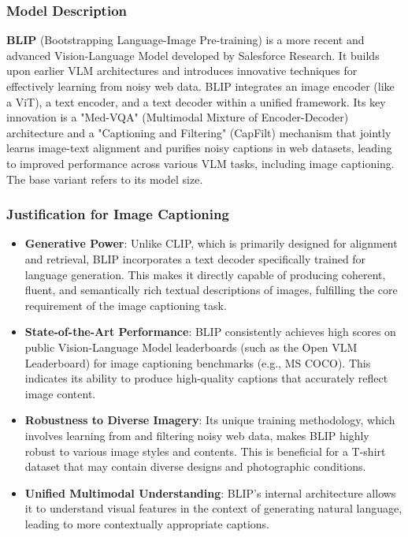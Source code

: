 \documentclass{article}
\begin{document}
\subsubsection{Model Description}
\textbf{BLIP} (Bootstrapping Language-Image Pre-training) is a more recent and advanced Vision-Language Model developed by Salesforce Research. It builds upon earlier VLM architectures and introduces innovative techniques for effectively learning from noisy web data. BLIP integrates an image encoder (like a ViT), a text encoder, and a text decoder within a unified framework. Its key innovation is a "Med-VQA" (Multimodal Mixture of Encoder-Decoder) architecture and a "Captioning and Filtering" (CapFilt) mechanism that jointly learns image-text alignment and purifies noisy captions in web datasets, leading to improved performance across various VLM tasks, including image captioning. The base variant refers to its model size.

\subsubsection{Justification for Image Captioning}
\begin{itemize}
    \item \textbf{Generative Power}: Unlike CLIP, which is primarily designed for alignment and retrieval, BLIP incorporates a text decoder specifically trained for language generation. This makes it directly capable of producing coherent, fluent, and semantically rich textual descriptions of images, fulfilling the core requirement of the image captioning task.
    \item \textbf{State-of-the-Art Performance}: BLIP consistently achieves high scores on public Vision-Language Model leaderboards (such as the Open VLM Leaderboard) for image captioning benchmarks (e.g., MS COCO). This indicates its ability to produce high-quality captions that accurately reflect image content.
    \item \textbf{Robustness to Diverse Imagery}: Its unique training methodology, which involves learning from and filtering noisy web data, makes BLIP highly robust to various image styles and contents. This is beneficial for a T-shirt dataset that may contain diverse designs and photographic conditions.
    \item \textbf{Unified Multimodal Understanding}: BLIP's internal architecture allows it to understand visual features in the context of generating natural language, leading to more contextually appropriate captions.
\end{itemize}
\end{document}
